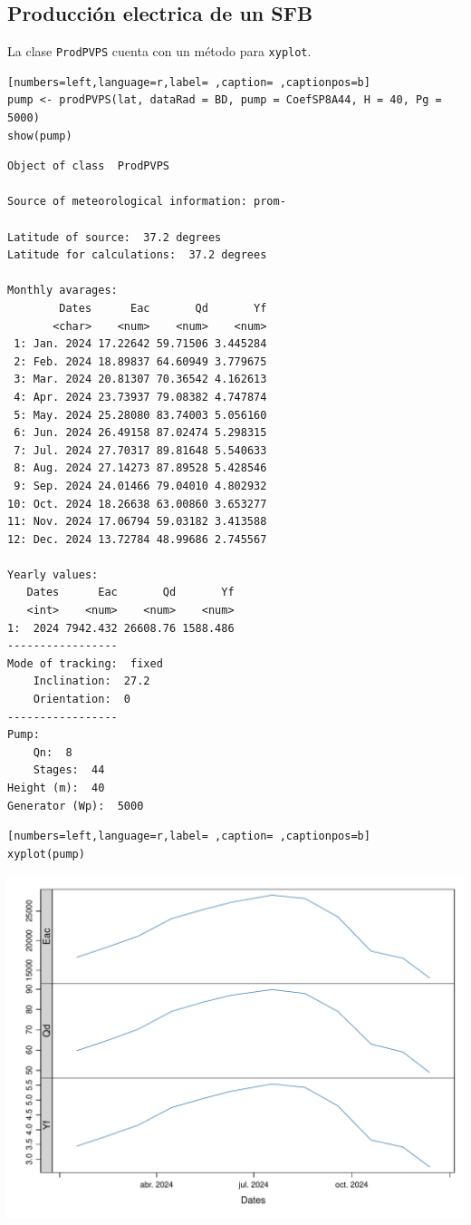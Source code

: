 \subsection{Producción electrica de un SFB}
\label{sec:org000ade1}
La clase \texttt{ProdPVPS} cuenta con un método para \texttt{xyplot}.
\begin{lstlisting}[numbers=left,language=r,label= ,caption= ,captionpos=b]
pump <- prodPVPS(lat, dataRad = BD, pump = CoefSP8A44, H = 40, Pg = 5000)
show(pump)
\end{lstlisting}

\begin{verbatim}
Object of class  ProdPVPS 

Source of meteorological information: prom- 

Latitude of source:  37.2 degrees
Latitude for calculations:  37.2 degrees

Monthly avarages:
        Dates      Eac       Qd       Yf
       <char>    <num>    <num>    <num>
 1: Jan. 2024 17.22642 59.71506 3.445284
 2: Feb. 2024 18.89837 64.60949 3.779675
 3: Mar. 2024 20.81307 70.36542 4.162613
 4: Apr. 2024 23.73937 79.08382 4.747874
 5: May. 2024 25.28080 83.74003 5.056160
 6: Jun. 2024 26.49158 87.02474 5.298315
 7: Jul. 2024 27.70317 89.81648 5.540633
 8: Aug. 2024 27.14273 87.89528 5.428546
 9: Sep. 2024 24.01466 79.04010 4.802932
10: Oct. 2024 18.26638 63.00860 3.653277
11: Nov. 2024 17.06794 59.03182 3.413588
12: Dec. 2024 13.72784 48.99686 2.745567

Yearly values:
   Dates      Eac       Qd       Yf
   <int>    <num>    <num>    <num>
1:  2024 7942.432 26608.76 1588.486
-----------------
Mode of tracking:  fixed 
    Inclination:  27.2 
    Orientation:  0 
-----------------
Pump:
    Qn:  8 
    Stages:  44 
Height (m):  40 
Generator (Wp):  5000
\end{verbatim}

\begin{lstlisting}[numbers=left,language=r,label= ,caption= ,captionpos=b]
xyplot(pump)
\end{lstlisting}

\begin{center}
\includegraphics[width=.9\linewidth]{figuras/codigo-prodpvps.pdf}
\end{center}

